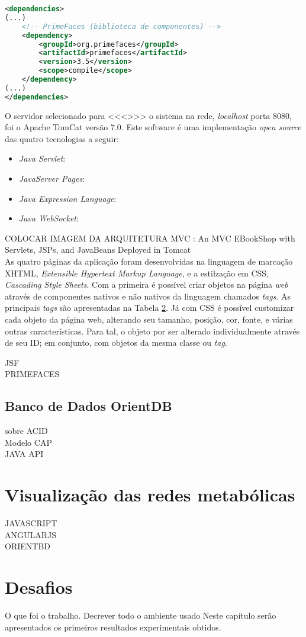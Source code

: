 \begin{lstlisting}[language=XML]
<dependencies>
(...)
	<!-- PrimeFaces (biblioteca de componentes) -->
	<dependency>
		<groupId>org.primefaces</groupId>
		<artifactId>primefaces</artifactId>
		<version>3.5</version>
		<scope>compile</scope>
	</dependency>
(...)
</dependencies>
\end{lstlisting}

\indent O servidor selecionado para <<<>>> o sistema na rede, \textit{localhost} porta 8080, foi o Apache TomCat versão 7.0. Este software é uma implementação \textit{open source} das quatro tecnologias \cite{oracle14} a seguir:
\begin{itemize}
	\item \textit{Java Servlet}: 
	\item \textit{JavaServer Pages}:
	\item \textit{Java Expression Language}:
	\item \textit{Java WebSocket}:
\end{itemize}

\indent COLOCAR IMAGEM DA ARQUITETURA MVC : An MVC EBookShop with Servlets, JSPs, and JavaBeans Deployed in Tomcat  \cite{chuan11} \\

\indent As quatro páginas da aplicação foram desenvolvidas na linguagem de marcação XHTML, \textit{Extensible Hypertext Markup Language}, e a estilzação em CSS, \textit{Cascading Style Sheets}. Com a primeira é possível criar objetos na página \textit{web} através de componentes nativos e não nativos da linguagem chamados \textit{tags}. As principais \textit{tags} são apresentadas na Tabela \ref{}. Já com CSS é possível customizar cada objeto da página web, alterando seu tamanho, posição, cor, fonte, e várias outras características. Para tal, o objeto por ser alterado individualmente através de seu ID; em conjunto, com objetos da mesma classe ou \textit{tag}.

\indent 

JSF \\
PRIMEFACES


%
%
%
%
\subsection{Banco de Dados OrientDB}
\indent sobre ACID \\
\indent Modelo CAP \\
\indent JAVA API \\

\section{Visualização das redes metabólicas}

JAVASCRIPT \\
ANGULARJS \\
ORIENTBD

\section{Desafios}
 

O que foi o trabalho. 
Decrever todo o ambiente usado
Neste capítulo serão apresentados os primeiros resultados experimentais obtidos.
